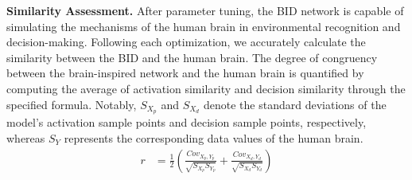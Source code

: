 \textbf{\textsf{Similarity Assessment.}} After parameter tuning, the BID network is capable of simulating the mechanisms of the human brain in environmental recognition and decision-making. Following each optimization, we accurately calculate the similarity between the BID and the human brain. The degree of congruency between the brain-inspired network and the human brain is quantified by computing the average of activation similarity and decision similarity through the specified formula. Notably, $S_{X_{p}}$ and $S_{X_{d}}$ denote the standard deviations of the model's activation sample points and decision sample points, respectively, whereas $S_{Y}$ represents the corresponding data values of the human brain.
\begin{align}
	r & = \frac{1}{2}\left(\frac{Cov_{X_{p},Y_{p}}}{\sqrt{S_{X_{p}} S_{Y_{p}}}}+\frac{Cov_{X_{d},Y_{d}}}{\sqrt{S_{X_{d}} S_{Y_{d}}}}\right)
\end{align}
